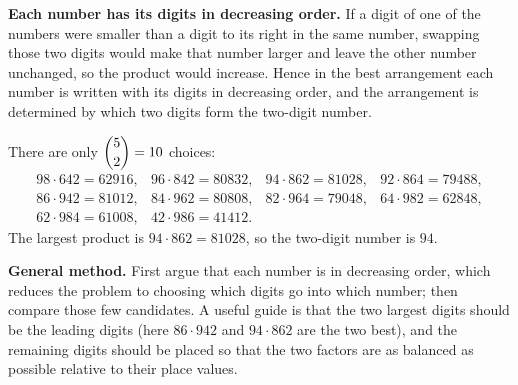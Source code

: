 \textbf{Each number has its digits in decreasing order.} If a digit of one of the numbers were smaller than a digit to its right in the same number, swapping those two digits would make that number larger and leave the other number unchanged, so the product would increase. Hence in the best arrangement each number is written with its digits in decreasing order, and the arrangement is determined by which two digits form the two-digit number.

There are only $\dbinom52=10$ choices:
\[
\begin{array}{llll}
98\cdot642=62916, & 96\cdot842=80832, & 94\cdot862=81028, & 92\cdot864=79488,\\
86\cdot942=81012, & 84\cdot962=80808, & 82\cdot964=79048, & 64\cdot982=62848,\\
62\cdot984=61008, & 42\cdot986=41412. & &
\end{array}
\]
The largest product is $94\cdot862=81028$, so the two-digit number is $\boxed{94}$.

\textbf{General method.} First argue that each number is in decreasing order, which reduces the problem to choosing which digits go into which number; then compare those few candidates. A useful guide is that the two largest digits should be the leading digits (here $86\cdot942$ and $94\cdot862$ are the two best), and the remaining digits should be placed so that the two factors are as balanced as possible relative to their place values.
